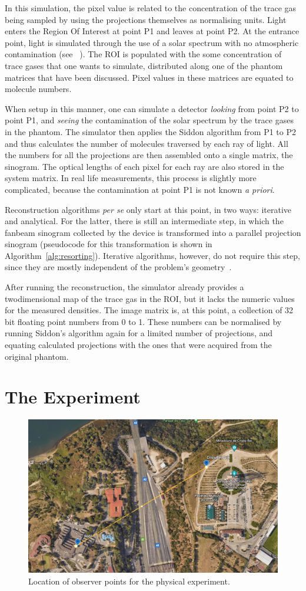 In this simulation, the pixel value is related to the concentration of
the trace gas being sampled by using the projections themselves as
normalising units. Light enters the Region Of Interest at point P1 and
leaves at point P2. At the entrance point, light is simulated through
the use of a solar spectrum with no atmospheric contamination (see
~\cite{Kurucz1984}). The ROI is populated with the some concentration of
trace gases that one wants to simulate, distributed along one of the
phantom matrices that have been discussed. Pixel values in these
matrices are equated to molecule numbers.

When setup in this manner, one can simulate a detector \emph{looking}
from point P2 to point P1, and \emph{seeing} the contamination of the
solar spectrum by the trace gases in the phantom. The simulator then
applies the Siddon algorithm from P1 to P2 and thus calculates the
number of molecules traversed by each ray of light. All the numbers for
all the projections are then assembled onto a single matrix, the
sinogram. The optical lengths of each pixel for each ray are also stored
in the system matrix. In real life measurements, this process is
slightly more complicated, because the contamination at point P1 is not
known \emph{a priori}.

Reconstruction algorithms \emph{per se} only start at this point, in two
ways: iterative and analytical. For the latter, there is still an
intermediate step, in which the fanbeam sinogram collected by the device
is transformed into a parallel projection sinogram (pseudocode for this
transformation is shown in Algorithm~\ref{alg:resorting}). Iterative
algorithms, however, do not require this step, since they are mostly
independent of the problem's geometry~\cite{Defrise2003}.

After running the reconstruction, the simulator already provides a
twodimensional map of the trace gas in the ROI, but it lacks the numeric
values for the measured densities. The image matrix is, at this point, a
collection of 32 bit floating point numbers from 0 to 1. These numbers
can be normalised by running Siddon's algorithm again for a limited
number of projections, and equating calculated projections with the ones
that were acquired from the original phantom.

\section{The Experiment}%
\label{sec:the_experiment}

\begin{figure}[htpb]
    \centering
    \includegraphics[width=0.8\linewidth]{img/png/experimentMap.png}
    \caption{Location of observer points for the physical experiment.}
    \label{fig:experiment_map}
\end{figure}
